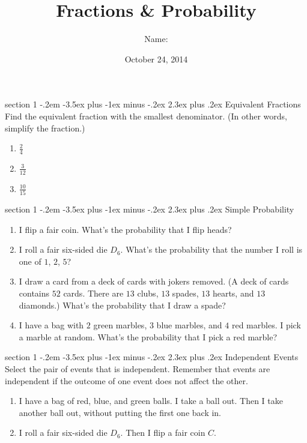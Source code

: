 \documentclass[12pt,letterpaper]{article}
\title{Fractions \& Probability}
\author{Name: \underline{\hspace{5cm}}}
\date{October 24, 2014}
\makeatletter
\newenvironment{problem}{\@startsection
       {section}
       {1}
       {-.2em}
       {-3.5ex plus -1ex minus -.2ex}
       {2.3ex plus .2ex}
       {\pagebreak[3]
       \large\bf\noindent{Problem }
       }
       }
\makeatother
\begin{document}
\maketitle

\thispagestyle{empty}

\begin{problem}{Equivalent Fractions}
 Find the equivalent fraction with the smallest denominator. (In other words, simplify the fraction.)
\begin{enumerate}[\hspace{.5cm}a.]
\item $\frac{2}{4}$
\item $\frac{3}{12}$
\item $\frac{10}{15}$
\end{enumerate}
\end{problem}

\begin{problem}{Simple Probability}
\begin{enumerate}[\hspace{.5cm}a.]
\item I flip a fair coin. What's the probability that I flip heads?
\item I roll a fair six-sided die $D_6$. What's the probability that the number I roll is one of $1$, $2$, $5$?
\item I draw a card from a deck of cards with jokers removed. (A deck of cards contains $52$ cards. There are $13$ clubs, $13$ spades,
$13$ hearts, and $13$ diamonds.) What's the probability that I draw a spade?
\item I have a bag with $2$ green marbles, $3$ blue marbles, and $4$ red marbles.
I pick a marble at random. What's the probability that I pick a red marble?
\end{enumerate}
\end{problem}

\begin{problem}{Independent Events}
Select the pair of events that is independent. Remember that events are independent if the outcome of one event
does not affect the other.

\begin{enumerate}[\hspace{.5cm}a.]
\item I have a bag of red, blue, and green balls. I take a ball out. Then I take another ball out, without putting the first one
back in.
\item I roll a fair six-sided die $D_6$. Then I flip a fair coin $C$.
\end{enumerate}
\end{problem}
\end{document}

